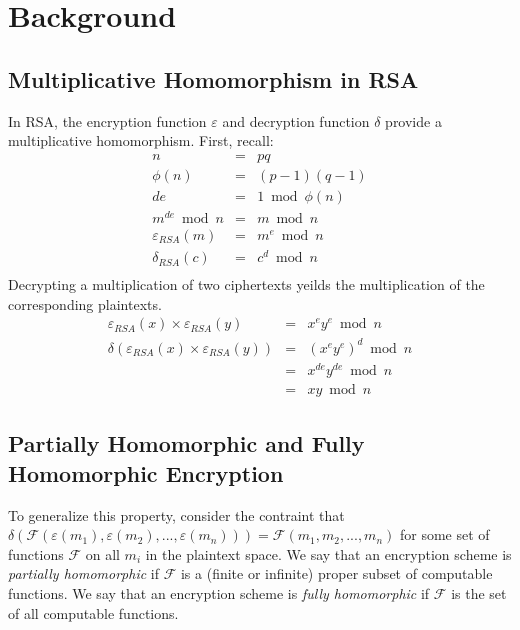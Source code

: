 \documentclass[a4paper,10pt]{article}
\begin{document}
\section{Background}

\subsection{Multiplicative Homomorphism in RSA}
In RSA, the encryption function $\varepsilon$ and decryption function $\delta$ provide a multiplicative homomorphism. First, recall:
\begin{eqnarray*}
n &=& pq\\
\phi(n) &=& (p-1)(q-1)\\
de &=& 1 \bmod \phi(n)\\
m^{de} \bmod n &=& m \bmod n\\
\varepsilon_{RSA}(m) &=& m^e \bmod n\\
\delta_{RSA}(c) &=& c^d \bmod n\\
\end{eqnarray*}
Decrypting a multiplication of two ciphertexts yeilds the multiplication of the corresponding plaintexts.
\begin{eqnarray*}
\varepsilon_{RSA}(x) \times \varepsilon_{RSA}(y) &=& x^e y^e \bmod n\\
\delta(\varepsilon_{RSA}(x) \times \varepsilon_{RSA}(y)) &=& (x^e y^e)^d \bmod n\\
&=& x^{de} y^{de} \bmod n\\
&=& x y \bmod n
\end{eqnarray*}

\subsection{Partially Homomorphic and Fully Homomorphic Encryption}
To generalize this property, consider the contraint that $\delta(\mathcal{F}(\varepsilon(m_1), \varepsilon(m_2), ..., \varepsilon(m_n))) = \mathcal{F}(m_1, m_2, ..., m_n)$ for some set of functions $\mathcal{F}$ on all $m_i$ in the plaintext space. We say that an encryption scheme is \textit{partially homomorphic} if $\mathcal{F}$ is a (finite or infinite) proper subset of computable functions. We say that an encryption scheme is \textit{fully homomorphic} if $\mathcal{F}$ is the set of all computable functions.
\end{document}
